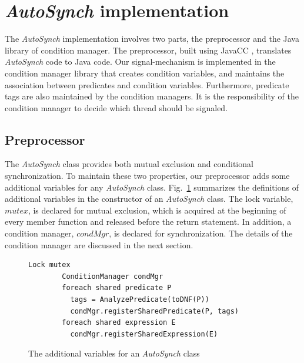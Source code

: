 \documentclass{sigplanconf}
\begin{document}
\section{{\em AutoSynch} implementation} \label{sec:imp}
The {\em AutoSynch} implementation involves two parts, the preprocessor and the 
Java library of condition manager. The preprocessor,  built using JavaCC
\cite{kod04}, translates  {\em AutoSynch} code to Java code. Our
signal-mechanism is implemented in the condition manager library that creates 
condition variables, and maintains the association between predicates and 
condition variables. Furthermore, predicate tags are also maintained by the 
condition managers. It is the responsibility of the condition manager to decide 
which thread should be signaled. 

\subsection{Preprocessor}
The {\em AutoSynch} class provides both mutual exclusion and conditional
synchronization. To maintain these two properties, our preprocessor adds some 
additional variables for any {\em AutoSynch} class. Fig.~\ref{fig:pre_cnst} 
summarizes the definitions of additional variables in the
constructor of an {\em AutoSynch} class. The lock 
variable, $mutex$, is declared for mutual exclusion, which is acquired at the 
beginning of every member function and released before the return statement.
In addition, a condition manager, $condMgr$, is declared for synchronization. 
The details of the condition manager are discussed in the next
section.  


\begin{figure}[ht!]
    \begin{Verbatim}[fontsize=\footnotesize,gobble=8,frame=lines,
            framesep=3mm]
        Lock mutex
        ConditionManager condMgr 
        foreach shared predicate P
          tags = AnalyzePredicate(toDNF(P))
          condMgr.registerSharedPredicate(P, tags)
        foreach shared expression E
          condMgr.registerSharedExpression(E)
    \end{Verbatim}
  \caption{The additional variables for an {\em AutoSynch} class}
  \label{fig:pre_cnst}
\end{figure}  
\end{document}
